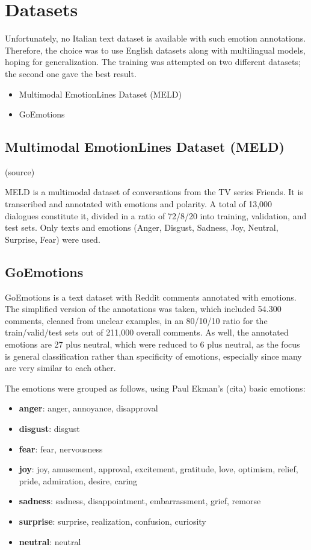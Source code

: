 \documentclass[11pt]{article}
\begin{document}
\section{Datasets}

Unfortunately, no Italian text dataset is available with such emotion annotations. Therefore, the choice was to use English datasets along with multilingual models, hoping for generalization. The training was attempted on two different datasets; the second one gave the best result.

\begin{itemize}
    \item Multimodal EmotionLines Dataset (MELD)
    \item GoEmotions
\end{itemize}

\subsection{Multimodal EmotionLines Dataset (MELD)} (source)

MELD is a multimodal dataset of conversations from the TV series Friends. It is transcribed and annotated with emotions and polarity. A total of 13,000 dialogues constitute it, divided in a ratio of 72/8/20 into training, validation, and test sets. Only texts and emotions (Anger, Disgust, Sadness, Joy, Neutral, Surprise, Fear) were used.

\subsection{GoEmotions}

GoEmotions is a text dataset with Reddit comments annotated with emotions. The simplified version of the annotations was taken, which included 54.300 comments, cleaned from unclear examples, in an 80/10/10 ratio for the train/valid/test sets out of 211,000 overall comments. As well, the annotated emotions are 27 plus neutral, which were reduced to 6 plus neutral, as the focus is general classification rather than specificity of emotions, especially since many are very similar to each other.

The emotions were grouped as follows, using Paul Ekman's (cita) basic emotions:

\begin{itemize}
  \setlength\itemsep{0.05em}
  \item \textbf{anger}: anger, annoyance, disapproval
  \item \textbf{disgust}: disgust
  \item \textbf{fear}: fear, nervousness
  \item \textbf{joy}: joy, amusement, approval, excitement, gratitude, love, optimism, relief, pride, admiration, desire, caring
  \item \textbf{sadness}: sadness, disappointment, embarrassment, grief, remorse
  \item \textbf{surprise}: surprise, realization, confusion, curiosity
  \item \textbf{neutral}: neutral
\end{itemize}
\end{document}
